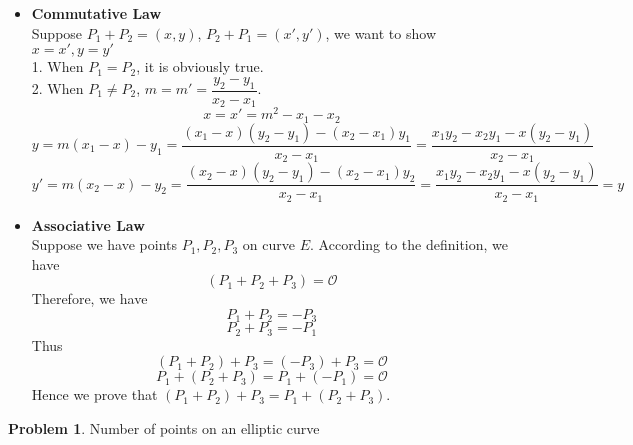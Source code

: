 \documentclass[12pt]{article}
\theoremstyle{definition}
\newtheorem{problem}{Problem}
\begin{document}
\begin{itemize}
    \item \textbf{Commutative Law}\\
    Suppose $P_1+P_2=(x,y)$, $P_2+P_1=(x',y')$, we want to show $x=x',y=y'$\\
    1. When $P_1=P_2$, it is obviously true.\\
    2. When $P_1 \neq P_2$, $m=m'=\dfrac{y_2-y_1}{x_2-x_1}$.
    $$x=x'=m^2-x_1-x_2$$
    $$y=m(x_1-x)-y_1=\frac{(x_1-x)(y_2-y_1)-(x_2-x_1)y_1}{x_2-x_1}=\frac{x_1y_2-x_2y_1-x(y_2-y_1)}{x_2-x_1}$$
    $$y'=m(x_2-x)-y_2=\frac{(x_2-x)(y_2-y_1)-(x_2-x_1)y_2}{x_2-x_1}=\frac{x_1y_2-x_2y_1-x(y_2-y_1)}{x_2    -x_1}=y$$
    \item \textbf{Associative Law}\\
    Suppose we have points $P_1,P_2,P_3$ on curve $E$. According to the definition, we have 
    $$(P_1+P_2+P_3) = \mathcal{O}$$
    Therefore, we have 
    $$P_1+P_2=-P_3$$
    $$P_2+P_3=-P_1$$
    Thus
    $$(P_1+P_2)+P_3=(-P_3)+P_3=\mathcal{O}$$
    $$P_1+(P_2+P_3)=P_1+(-P_1)=\mathcal{O}$$
    Hence we prove that $(P_1+P_2)+P_3=P_1+(P_2+P_3)$.
\end{itemize}
\begin{problem}
Number of points on an elliptic curve
\end{problem}
\end{document}
